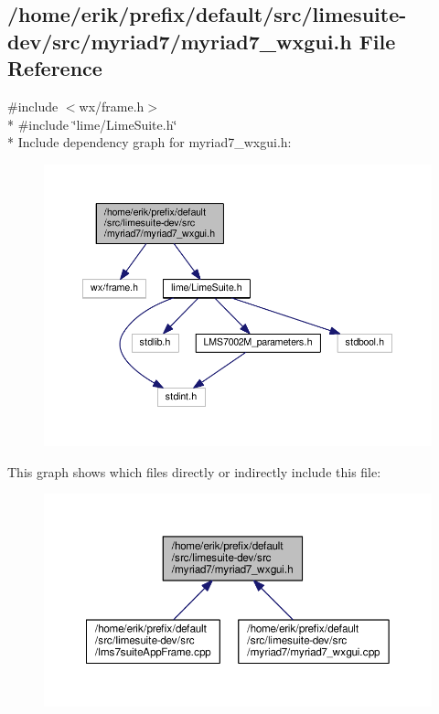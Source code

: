 \subsection{/home/erik/prefix/default/src/limesuite-\/dev/src/myriad7/myriad7\+\_\+wxgui.h File Reference}
\label{myriad7__wxgui_8h}
{\ttfamily \#include $<$wx/frame.\+h$>$}\\*
{\ttfamily \#include \char`\"{}lime/\+Lime\+Suite.\+h\char`\"{}}\\*
Include dependency graph for myriad7\+\_\+wxgui.\+h\+:
\nopagebreak
\begin{figure}[H]
\begin{center}
\leavevmode
\includegraphics[width=350pt]{d3/d8f/myriad7__wxgui_8h__incl}
\end{center}
\end{figure}
This graph shows which files directly or indirectly include this file\+:
\nopagebreak
\begin{figure}[H]
\begin{center}
\leavevmode
\includegraphics[width=350pt]{d0/d53/myriad7__wxgui_8h__dep__incl}
\end{center}
\end{figure}
